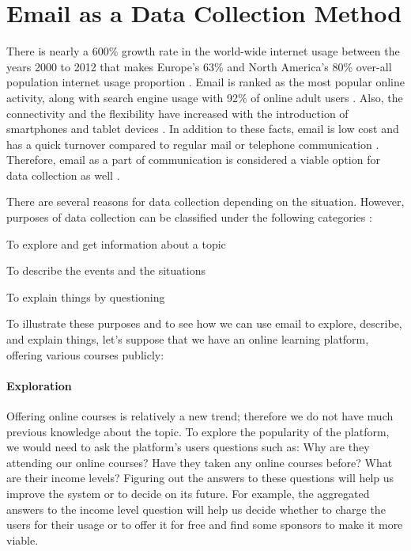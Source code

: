 \section{Email as a Data Collection Method}
\label{sec:1:EmailDataCol}

There is nearly a 600\% growth rate in the world-wide internet usage between the years 2000 to 2012 that makes Europe's 63\% and North America's 80\% over-all population internet usage proportion \citep{InternetWorldStats2012}. Email is ranked as the most popular online activity, along with search engine usage with 92\% of online adult users \citep{Purcell2011}. Also, the connectivity and the flexibility have increased with the introduction of smartphones and tablet devices \citep{Madden2008}. In addition to these facts, email is low cost and has a quick turnover compared to regular mail or telephone communication \citep{Zikmund2007}. Therefore, email as a part of communication is considered a viable option for data collection as well \citep{Zikmund2007}.
\vspace{1cm}

There are several reasons for data collection depending on the situation. However, purposes of data collection can be classified under the following categories \citep{Sue2011} \citep[pages 92--94]{Babbie2010}:

\begin{compactenum}
	\item To explore and get information about a topic
	\item To describe the events and the situations
	\item To explain things by questioning
\end{compactenum}

To illustrate these purposes and to see how we can use email to explore, describe, and explain things, let's suppose that we have an online learning platform, offering various courses publicly:

\paragraph{Exploration}
Offering online courses is relatively a new trend; therefore we do not have much previous knowledge about the topic. To explore the popularity of the platform, we would need to ask the platform's users questions such as: Why are they attending our online courses? Have they taken any online courses before? What are their income levels? Figuring out the answers to these questions will help us improve the system or to decide on its future. For example, the aggregated answers to the income level question will help us decide whether to charge the users for their usage or to offer it for free and find some sponsors to make it more viable.

